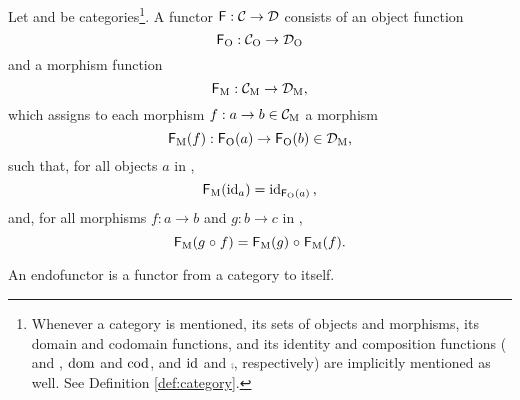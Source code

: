 \begin{definition}
  \label{def:functor}


  Let  and  be categories\footnote{Whenever a category  is mentioned, its sets of
    objects and morphisms, its domain and codomain functions, and its
    identity and composition functions ( and , $\operatorname{dom}$
    and $\operatorname{cod}$, and $\operatorname{id}$ and $\comp$, respectively) are implicitly
    mentioned as well. See Definition \ref{def:category}.}. A functor
  $\mathsf{F}: \mathcal{C} \to \mathcal{D}$ consists of an object function
  \begin{equation}
    \label{eq:functor-object}
    \mathsf{F}_{\operatorname{O}}: \mathcal{C}_{\operatorname{O}} \to \mathcal{D}_{\operatorname{O}}
  \end{equation}
  and a morphism function
  \begin{equation}
    \label{eq:functor-morphism}
    \mathsf{F}_{\operatorname{M}}: \mathcal{C}_{\operatorname{M}} \to \mathcal{D}_{\operatorname{M}}
    \text{,}
  \end{equation}
  which assigns to each morphism $f: a \to b \in \mathcal{C}_{\operatorname{M}}$ a morphism
  \begin{equation*}
    \mathsf{F}_{\operatorname{M}}(f): \mathsf{F}_{\operatorname{O}}(a) \to \mathsf{F}_{\operatorname{O}}(b) \in \mathcal{D}_{\operatorname{M}}
    \text{,}
  \end{equation*}
  such that, for all objects $a$ in ,
  \begin{equation}
    \label{eq:functor-identity}
    \mathsf{F}_{\operatorname{M}}(\operatorname{id}_{a}) = \operatorname{id}_{\mathsf{F}_{\operatorname{O}}(a)}
    \text{,}
  \end{equation}
  and, for all morphisms $f: a \to b$ and $g: b \to c$ in ,
  \begin{equation}
    \label{eq:functor-composition}
    \mathsf{F}_{\operatorname{M}}(g \mathrel{\circ} f) = \mathsf{F}_{\operatorname{M}}(g) \mathrel{\circ} \mathsf{F}_{\operatorname{M}}(f)
    \text{.}
  \end{equation}

\end{definition}

\begin{definition}
  \label{def:endofunctor}

  An endofunctor is a functor from a category to itself.

\end{definition}

